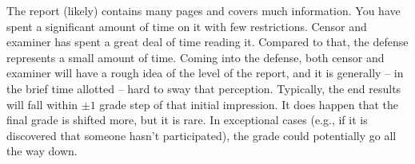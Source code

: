 \documentclass[a4paper, oneside]{memoir}
\begin{document}
The report (likely) contains many pages and covers much information. You have spent a significant amount of time on it with few restrictions. Censor and examiner has spent a great deal of time reading it. Compared to that, the defense represents a small amount of time. Coming into the defense, both censor and examiner will have a rough idea of the level of the report, and it is generally -- in the brief time allotted -- hard to sway that perception. Typically, the end results will fall within $\pm 1$ grade step of that initial impression. It does happen that the final grade is shifted more, but it is rare. In exceptional cases (e.g., if it is discovered that someone hasn't participated), the grade could potentially go all the way down.

\printbibliography

\printindex
\end{document}
